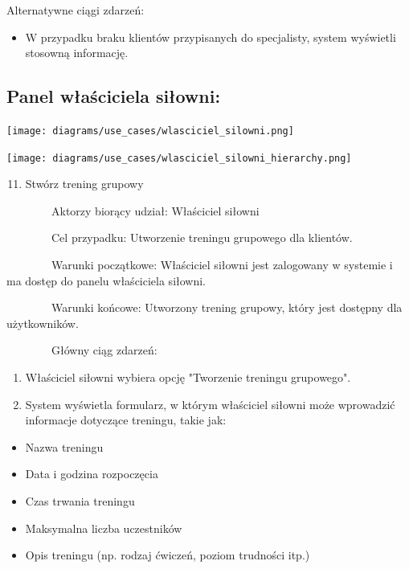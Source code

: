 \documentclass[
]{article}
\providecommand{\tightlist}{%
  \setlength{\itemsep}{0pt}\setlength{\parskip}{0pt}}
\begin{document}
{Alternatywne ciągi zdarzeń:}

\begin{itemize}
\tightlist
\item
  {W przypadku braku klientów przypisanych do specjalisty, system
  wyświetli stosowną informację.}
\end{itemize}

{}

\hypertarget{h.2ol8m2kl4itm}{%
\subsection{\texorpdfstring{{Panel właściciela
siłowni:}}{Panel właściciela siłowni:}}\label{h.2ol8m2kl4itm}}

{\texttt{[image: diagrams/use\_cases/wlasciciel\_silowni.png]}}

{\texttt{[image: diagrams/use\_cases/wlasciciel\_silowni\_hierarchy.png]}}

\begin{enumerate}
\setcounter{enumi}{10}
\tightlist
\item
  {Stwórz trening grupowy}
\end{enumerate}

{~~~~~~~~}{Aktorzy biorący udział: Właściciel siłowni}

{~~~~~~~~Cel przypadku: Utworzenie treningu grupowego dla klientów.}

{~~~~~~~~Warunki początkowe: Właściciel siłowni jest zalogowany w
systemie i ma dostęp do panelu właściciela siłowni.}

{~~~~~~~~Warunki końcowe: Utworzony trening grupowy, który jest dostępny
dla użytkowników.}

{~~~~~~~~Główny ciąg zdarzeń:}

\begin{enumerate}
\tightlist
\item
  {Właściciel siłowni wybiera opcję "Tworzenie treningu grupowego".}
\item
  {System wyświetla formularz, w którym właściciel siłowni może
  wprowadzić informacje dotyczące treningu, takie jak:}
\end{enumerate}

\begin{itemize}
\tightlist
\item
  {Nazwa treningu}
\item
  {Data i godzina rozpoczęcia}
\item
  {Czas trwania treningu}
\item
  {Maksymalna liczba uczestników}
\item
  {Opis treningu (np. rodzaj ćwiczeń, poziom trudności itp.)}
\end{itemize}
\end{document}
